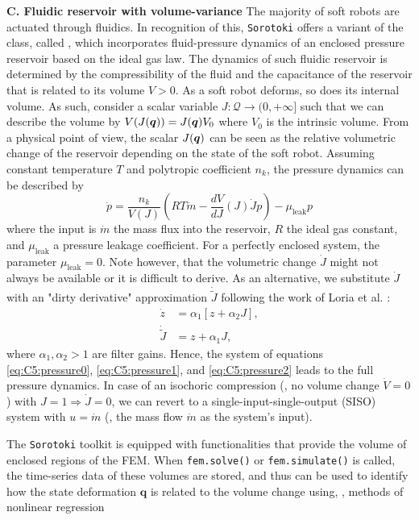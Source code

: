 \textbf{C. Fluidic reservoir with volume-variance}
The majority of soft robots are actuated through fluidics. In recognition of this, \texttt{Sorotoki} offers a variant of the  class, called , which incorporates fluid-pressure dynamics of an enclosed pressure reservoir based on the ideal gas law. The dynamics of such fluidic reservoir is determined by the compressibility of the fluid and the capacitance of the reservoir that is related to its volume $V > 0$. As a soft robot deforms, so does its internal volume. As such, consider a scalar variable $J: \mathcal{Q} \to (0,+\infty]$ such that we can describe the volume by $V(J({\boldsymbol{q}})) = J({\boldsymbol{q}}) V_0$ where $V_0$ is the intrinsic volume. From a physical point of view, the scalar $J({\boldsymbol{q}})$ can be seen as the relative volumetric change of the reservoir depending on the state of the soft robot. Assuming constant temperature $T$ and polytropic coefficient $n_k$, the pressure dynamics can be described by
%
\begin{equation}
    \dot{p} = \frac{n_k}{V(J)} \left( R T \dot{m} - \frac{d V}{d J}(J) \dot{J} p \right) - \mu_{\textrm{leak}} p
    \label{eq:C5:pressure0}
\end{equation}
%
where the input is $\dot{m}$ the mass flux into the reservoir, $R$ the ideal gas constant, and $\mu_{\textrm{leak}}$ a pressure leakage coefficient. For a perfectly enclosed system, the parameter $\mu_{\textrm{leak}} = 0$. Note however, that the volumetric change $\dot{J}$ might not always be available or it is difficult to derive. As an alternative, we substitute $\dot{J}$ with an "dirty derivative" approximation $\dot{\tilde{J}}$ following the work of Loria et al. \cite{Loria2015Jun}:
%
\begin{align}
    \dot{z}         & = \alpha_1 [z + \alpha_2 J ], \label{eq:C5:pressure1}\\
    \dot{\tilde{J}} & = z + \alpha_1 J, \label{eq:C5:pressure2}
\end{align}
%
where $\alpha_1,\alpha_2> 1$ are filter gains. Hence, the system of equations \eqref{eq:C5:pressure0}, \eqref{eq:C5:pressure1}, and \eqref{eq:C5:pressure2} leads to the full pressure dynamics. In case of an isochoric compression (\ie, no volume change $\dot{V} = 0$) with $J = 1 \Rightarrow \dot{J} = 0$, we can revert to a single-input-single-output (SISO) system with $u = \dot{m}$ (\ie, the mass flow $\dot{m}$ as the system's input).

\begin{rmk}
The \texttt{Sorotoki} toolkit is equipped with functionalities that provide the volume of enclosed regions of the FEM. When \texttt{fem.solve()} or \texttt{fem.simulate()} is called, the time-series data of these volumes are stored, and thus can be used to identify how the state deformation $\mathbf{q}$ is related to the volume change using, \eg, methods of nonlinear regression
\end{rmk}

